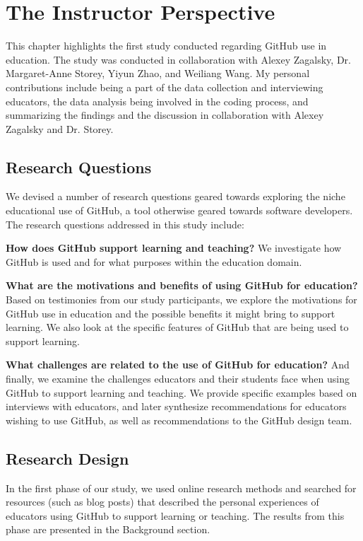 \chapter{The Instructor Perspective}
This chapter highlights the first study conducted regarding GitHub use in education. The study was conducted in collaboration with Alexey Zagalsky, Dr. Margaret-Anne Storey, Yiyun Zhao, and Weiliang Wang. My personal contributions include being a part of the data collection and interviewing educators, the data analysis being involved in the coding process, and summarizing the findings and the discussion in collaboration with Alexey Zagalsky and Dr. Storey. %

\section{Research Questions}
We devised a number of research questions geared towards exploring the niche educational use of GitHub, a tool otherwise geared towards software developers. The research questions addressed in this study include:

\textbf{How does GitHub support learning and teaching?} We investigate how GitHub is used and for what purposes within the education domain. %

\textbf{What are the motivations and benefits of using GitHub for education?} Based on testimonies from our study participants, we explore the motivations for GitHub use in education and the possible benefits it might bring to support learning. We also look at the specific features of GitHub that are being used to support learning.

\textbf{What challenges are related to the use of GitHub for education?} And finally, we examine the challenges educators and their students face when using GitHub to support learning and teaching. We provide specific examples based on interviews with educators, and later synthesize recommendations for educators wishing to use GitHub, as well as recommendations to the GitHub design team.

\section{Research Design}
In the first phase of our study, we used online research methods \cite{wakeford2008fieldnotes} and searched for resources (such as blog posts) that described the personal experiences of educators using GitHub to support learning or teaching. The results from this phase are presented in the Background section.

